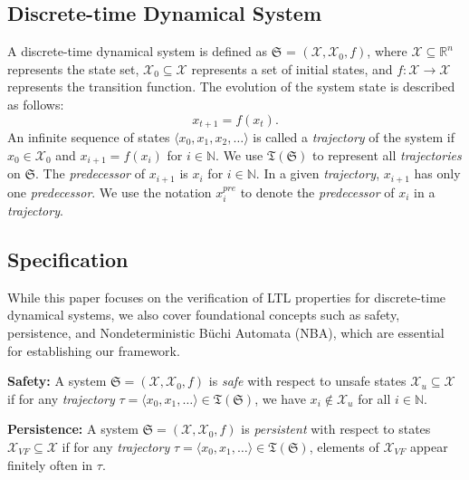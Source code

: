 \subsection{Discrete-time Dynamical System}
\label{dtds}
A discrete-time dynamical system is defined as $\mathfrak{S}$ = $(\mathcal{X}, \mathcal{X}_0, f)$, where $\mathcal{X} \subseteq \mathbb{R}^n$ represents the state set, $\mathcal{X}_{0} \subseteq \mathcal{X}$ represents a set of initial states, and $f: \mathcal{X} \rightarrow \mathcal{X}$ represents the transition function. The evolution of the system state is described as follows:
\[
  x_{t+1} = f(x_t).
\]
An infinite sequence of states $\langle x_0, x_1, x_2, \dots \rangle$ is called a \emph{trajectory} of the system if $x_0 \in \mathcal{X}_0$ and $x_{i+1} = f(x_{i})$ for $i \in \mathbb{N}$. We use $\mathfrak{T}(\mathfrak{S})$ to represent all \emph{trajectories} on $\mathfrak{S}$. The \emph{predecessor} of \(x_{i+1}\) is \(x_i\) for \(i \in \mathbb{N}\). In a given \emph{trajectory}, \(x_{i+1}\) has only one \emph{predecessor}. We use the notation \(x_{i}^{pre}\) to denote the \emph{predecessor} of \(x_{i}\) in a \emph{trajectory}.
\subsection{Specification}
\label{specification123}
While this paper focuses on​ the verification of LTL properties for discrete-time dynamical systems, we also cover​ foundational concepts such as​ safety, persistence, and Nondeterministic Büchi Automata (NBA), which are essential for establishing our framework.

\textbf{Safety:} A system $\mathfrak{S}=(\mathcal{X}, \mathcal{X}_0, f)$ is \emph{safe} with respect to unsafe states $\mathcal{X}_u \subseteq \mathcal{X}$ if for any \emph{trajectory} $\tau = \langle x_0, x_1, \dots \rangle \in \mathfrak{T}(\mathfrak{S})$, we have $x_i \not\in \mathcal{X}_u$ for all $i \in \mathbb{N}$.

\textbf{Persistence:} A system $\mathfrak{S}=(\mathcal{X}, \mathcal{X}_0, f)$ is \emph{persistent} with respect to states $\mathcal{X}_{VF} \subseteq \mathcal{X}$ if for any \emph{trajectory} $\tau = \langle x_0, x_1, \dots \rangle \in \mathfrak{T}(\mathfrak{S})$, elements of $\mathcal{X}_{VF}$ appear finitely often in $\tau$.

